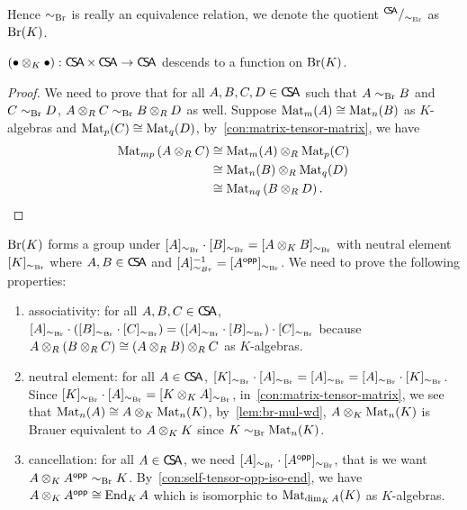 Hence $\sim_{\Br}$ is really an equivalence relation, we denote the quotient ${}^{\CSA}/_{\sim_{\Br}}$ as $\Br(K)$.

\begin{lemma}\label{lem:br-mul-wd}
  $(\bullet\otimes_{K}\bullet):\CSA\times\CSA \to \CSA$ descends to a function on $\Br(K)$.
  \leanok
\end{lemma}
\begin{proof}
  We need to prove that for all $A, B, C, D \in \CSA$ such that $A\sim_{\Br} B$ and $C\sim_{\Br}D$, $A\otimes_{R}C \sim_{\Br} B\otimes_{R}D$ as well.
  Suppose $\Mat_{m}(A)\cong \Mat_{n}(B)$ as $K$-algebras and $\Mat_{p}(C)\cong\Mat_{q}(D)$, by~\cref{con:matrix-tensor-matrix}, we have
  \[
    \begin{aligned}
      \Mat_{mp}\left(A\otimes_{R} C\right)&\cong \Mat_{m}(A)\otimes_{R}\Mat_{p}(C) \\
                                          &\cong \Mat_{n}(B)\otimes_{R}\Mat_{q}(D)\\
      &\cong \Mat_{nq}\left(B\otimes_{R}D\right).
    \end{aligned}
  \]

\end{proof}

\begin{construction}\label{con:br}
  $\Br(K)$ forms a group under $[A]_{\sim_{\Br}}\cdot[B]_{\sim_{\Br}}=[A\otimes_{K}B]_{\sim_{\Br}}$ with neutral element $[K]_{\sim_{\Br}}$ where $A, B\in\CSA$ and $[A]_{\sim_{Br}}^{-1}=[A^{\opp}]_{\sim_{\Br}}$. We need to prove the following properties:
  \begin{enumerate}
    \item associativity: for all $A, B, C\in\CSA$, $[A]_{\sim_{\Br}}\cdot\left([B]_{\sim_{\Br}}\cdot[C]_{\sim_{\Br}}\right)=\left([A]_{\sim_{\Br}}\cdot[B]_{\sim_{\Br}}\right)\cdot [C]_{\sim_{\Br}}$ because $A\ox_{R}\left(B\ox_{R}C\right)\cong \left(A\ox_{R}B\right)\ox_{R}C$ as $K$-algebras.
    \item neutral element: for all $A\in \CSA$, $[K]_{\sim_{\Br}}\cdot[A]_{\sim_{\Br}}=[A]_{\sim_{\Br}}=[A]_{\sim_{\Br}}\cdot [K]_{\sim_{\Br}}$. Since $[K]_{\sim_{\Br}}\cdot[A]_{\sim_{\Br}}=[K\ox_{K} A]_{\sim_{\Br}}$, in~\cref{con:matrix-tensor-matrix}, we see that $\Mat_{n}(A)\cong A\ox_{K}\Mat_{n}(K)$, by~\cref{lem:br-mul-wd}, $A\ox_{K}\Mat_{n}(K)$ is Brauer equivalent to $A\ox_{K} K$ since $K\sim_{\Br}\Mat_{n}(K)$.
    \item cancellation: for all $A \in \CSA$, we need $[A]_{\sim_{\Br}}\cdot[A^{\opp}]_{\sim_{\Br}}$, that is we want $A\ox_{K}A^{\opp}\sim_{\Br} K$. By~\cref{con:self-tensor-opp-iso-end}, we have $A\ox_{K}A^{\opp}\cong \End_{K}A$ which is isomorphic to $\Mat_{\dim_{K}A}(K)$ as $K$-algebras.
  \end{enumerate}
  \leanok
\end{construction}

